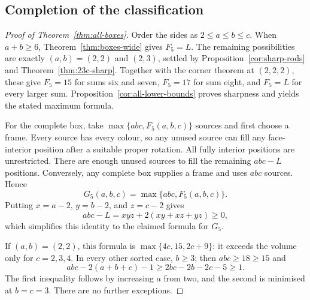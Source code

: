 \subsection{Completion of the classification}
\begin{proof}[Proof of Theorem~\ref{thm:all-boxes}]
Order the sides as $2\le a\le b\le c$. When $a+b\ge6$,
Theorem~\ref{thm:boxes-wide} gives $F_5=L$. The remaining possibilities
are exactly $(a,b)=(2,2)$ and $(2,3)$, settled by
Proposition~\ref{cor:sharp-rods} and Theorem~\ref{thm:23c-sharp}.
Together with the corner theorem at $(2,2,2)$, these give $F_5=15$
for sums six and seven, $F_5=17$ for sum eight, and $F_5=L$
for every larger sum. Proposition~\ref{cor:all-lower-bounds} proves
sharpness and yields the stated maximum formula.

For the complete box, take $\max\{abc,F_5(a,b,c)\}$ sources and first
choose a frame. Every source has every colour, so any unused source can
fill any face-interior position after a suitable proper rotation. All
fully interior positions are unrestricted. There are enough unused
sources to fill the remaining $abc-L$ positions. Conversely, any complete
box supplies a frame and uses $abc$ sources. Hence
\[
 G_5(a,b,c)=\max\{abc,F_5(a,b,c)\}.
\]
Putting $x=a-2$, $y=b-2$, and $z=c-2$ gives
\[
 abc-L=xyz+2(xy+xz+yz)\ge0,
\]
which simplifies this identity to the claimed formula for $G_5$.

If $(a,b)=(2,2)$, this formula is $\max\{4c,15,2c+9\}$: it exceeds
the volume only for $c=2,3,4$. In every other sorted case, $b\ge3$;
then $abc\ge18\ge15$ and
\[
 abc-2(a+b+c)-1\ge 2bc-2b-2c-5\ge1.
\]
The first inequality follows by increasing $a$ from two, and the second
is minimised at $b=c=3$. There are no further exceptions.
\end{proof}

